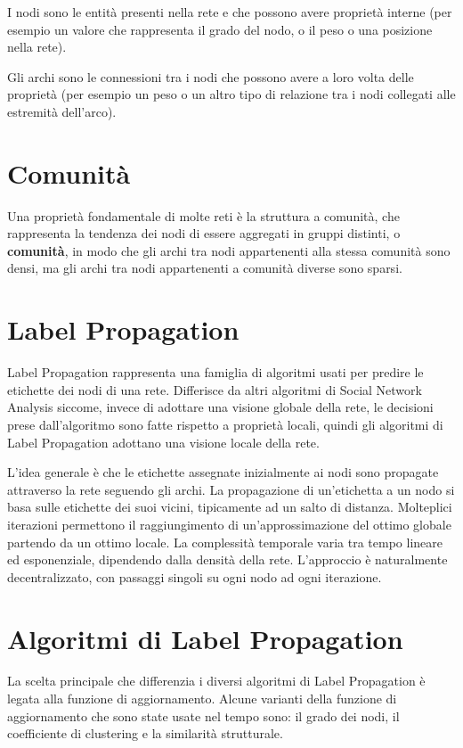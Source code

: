 \documentclass[a4paper,12pt]{report}
\begin{document}
	 I nodi sono le entità presenti nella rete e che possono avere proprietà interne (per esempio un valore che rappresenta il grado del nodo, o il peso o una posizione nella rete). 

	Gli archi sono le connessioni tra i nodi che possono avere a loro volta delle proprietà (per esempio un peso o un altro tipo di relazione tra i nodi collegati alle estremità dell'arco).	\cite{snaintro} 

	\section{Comunità}
	Una proprietà fondamentale di molte reti è la struttura a comunità, che rappresenta la tendenza dei nodi di essere aggregati in gruppi distinti, o \textbf{comunità}, in modo che gli archi tra nodi appartenenti alla stessa comunità sono densi, ma gli archi tra nodi appartenenti a comunità diverse sono sparsi. \cite{gregory}

	\section{Label Propagation}
	Label Propagation rappresenta una famiglia di algoritmi usati per predire le etichette dei nodi di una rete. 
	Differisce da altri algoritmi di Social Network Analysis siccome, invece di adottare una visione globale della rete, le decisioni prese dall'algoritmo sono fatte rispetto a proprietà locali, quindi gli algoritmi di Label Propagation adottano una visione locale della rete. \cite{raghavan} 

	L'idea generale è che le etichette assegnate inizialmente ai nodi sono propagate attraverso la rete seguendo gli archi. La propagazione di un'etichetta a un nodo si basa sulle etichette dei suoi vicini, tipicamente ad un salto di distanza. Molteplici iterazioni permettono il raggiungimento di un'approssimazione del ottimo globale partendo da un ottimo locale. La complessità temporale varia tra tempo lineare ed esponenziale, dipendendo dalla densità della rete. L'approccio è naturalmente decentralizzato, con passaggi singoli su ogni nodo ad ogni iterazione. \cite{avpra}
	
	\section{Algoritmi di Label Propagation}
	La scelta principale che differenzia i diversi algoritmi di Label Propagation è legata alla funzione di aggiornamento. Alcune varianti della funzione di aggiornamento che sono state usate nel tempo sono: il grado dei nodi, il coefficiente di clustering e la similarità strutturale.
\end{document}
